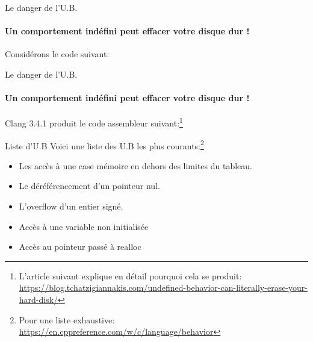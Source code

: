 \documentclass{beamer}
\begin{document}
\begin{darkframes}

	\begin{frame}{Le danger de l'U.B.}
		\framesubtitle{Un comportement indéfini peut effacer votre disque dur !}
		Considérons le code suivant:
		\ubdisk
	\end{frame}

	\begin{frame}{Le danger de l'U.B.}
		\framesubtitle{Un comportement indéfini peut effacer votre disque dur !}
		Clang 3.4.1 produit le code assembleur suivant:\footnote[frame]{L'article suivant explique en détail pourquoi cela se produit: \url{https://blog.tchatzigiannakis.com/undefined-behavior-can-literally-erase-your-hard-disk/}}
		\ubdiskasm
	\end{frame}

	\begin{frame}{Liste d'U.B}
		Voici une liste des U.B les plus courants:\footnote[frame]{Pour une liste exhaustive: \url{https://en.cppreference.com/w/c/language/behavior}}
		\begin{itemize}
			\item Les accès à une case mémoire en dehors des limites du tableau.
			\item Le déréférencement d'un pointeur nul.
			\item L'overflow d'un entier signé.
			\item Accès à une variable non initialisée
			\item Accès au pointeur passé à realloc
		\end{itemize}
	\end{frame}
	  	

\end{darkframes}
\end{document}
